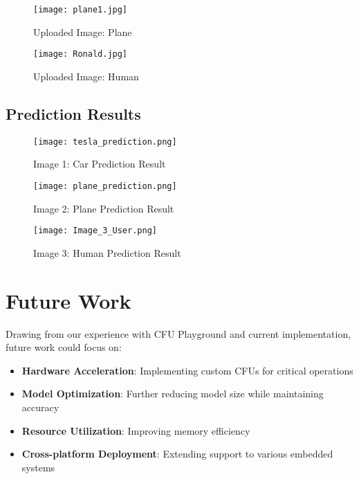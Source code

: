 \documentclass{article}
\begin{document}
\begin{figure}[H]
    \centering
    \texttt{[image: plane1.jpg]}
    \caption{Uploaded Image: Plane}
    \label{fig:plane}
\end{figure}

\begin{figure}[H]
    \centering
    \texttt{[image: Ronald.jpg]}
    \caption{Uploaded Image: Human}
    \label{fig:ronald}
\end{figure}

\subsection{Prediction Results}
\begin{figure}[H]
    \centering
    \texttt{[image: tesla\_prediction.png]}
    \caption{Image 1: Car Prediction Result}
    \label{fig:output1}
\end{figure}

\begin{figure}[H]
    \centering
    \texttt{[image: plane\_prediction.png]}
    \caption{Image 2: Plane Prediction Result}
    \label{fig:output2}
\end{figure}

\begin{figure}[H]
    \centering
    \texttt{[image: Image\_3\_User.png]}
    \caption{Image 3: Human Prediction Result}
    \label{fig:output3}
\end{figure}

\section{Future Work}
Drawing from our experience with CFU Playground and current implementation, future work could focus on:

\begin{itemize}
    \item \textbf{Hardware Acceleration}: Implementing custom CFUs for critical operations
    \item \textbf{Model Optimization}: Further reducing model size while maintaining accuracy
    \item \textbf{Resource Utilization}: Improving memory efficiency
    \item \textbf{Cross-platform Deployment}: Extending support to various embedded systems
\end{itemize}
\end{document}
